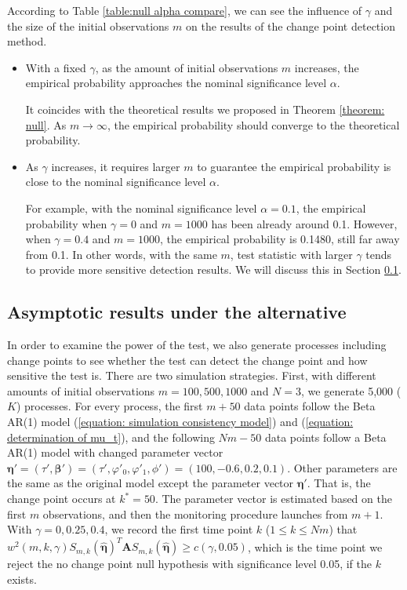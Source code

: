 \documentclass{article}
\theoremstyle{definition}
\begin{document}
According to Table \ref{table:null alpha compare}, we can see the influence of $\gamma$ and the size of the initial observations $m$ on the results of the change point detection method.
\begin{itemize}
    \item With a fixed $\gamma$, as the amount of initial observations $m$ increases, the empirical probability approaches the nominal significance level $\alpha$. 
    
    It coincides with the theoretical results we proposed in Theorem \ref{theorem: null}. As $m \rightarrow \infty$, the empirical probability should converge to the theoretical probability.
    
    \item As $\gamma$ increases, it requires larger $m$ to guarantee the empirical probability is close to the nominal significance level $\alpha$. 
    
    For example, with the nominal significance level $\alpha = 0.1$, the empirical probability when $\gamma = 0$ and $m=1000$ has been already around 0.1. However, when $\gamma = 0.4$ and $m=1000$, the empirical probability is 0.1480, still far away from 0.1. In other words, with the same $m$, test statistic with larger $\gamma$ tends to provide more sensitive detection results. We will discuss this in Section \ref{sec: asymptotic results under the alternative}.
\end{itemize}

\subsection{Asymptotic results under the alternative}
\label{sec: asymptotic results under the alternative}
In order to examine the power of the test, we also generate processes including change points to see whether the test can detect the change point and how sensitive the test is. There are two simulation strategies. 
First, with different amounts of initial observations $m=100,500,1000$ and $N=3$, we generate 5,000 ($K$) processes. For every process, the first $m+50$ data points follow the Beta AR(1) model (\ref{equation: simulation consistency model}) and (\ref{equation: determination of mu_t}), and the following $Nm-50$ data points follow a Beta AR(1) model with changed parameter vector $\bm{\eta}' = (\tau', \bm{\beta}') = (\tau', \varphi'_0, \varphi'_1, \phi') = (100, -0.6, 0.2, 0.1)$. Other parameters are the same as the original model except the parameter vector $\bm{\eta}'$. That is, the change point occurs at $k^* = 50$. The parameter vector is estimated based on the first $m$ observations, and then the monitoring procedure launches from $m+1$. With $\gamma = 0, 0.25, 0.4$, we record the first time point $k$ ($1\leq k \leq Nm$) that $w^2(m,k,\gamma)S_{m,k}(\hat{\bm{\eta}})^T\bm{A}S_{m,k}(\hat{\bm{\eta}}) \geq c(\gamma,0.05)$, which is the time point we reject the no change point null hypothesis with significance level 0.05, if the $k$ exists. 
\end{document}
